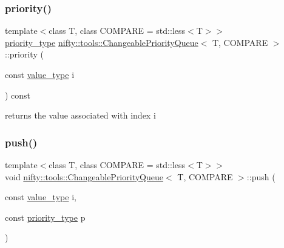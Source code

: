 \mbox{\label{classnifty_1_1tools_1_1ChangeablePriorityQueue_af437e744315c988b3cddbe66b4cfbe68}} 
\subsubsection{\texorpdfstring{priority()}{priority()}}
{\footnotesize\ttfamily template$<$class T, class C\+O\+M\+P\+A\+RE = std\+::less$<$\+T$>$$>$ \\
\hyperlink{classnifty_1_1tools_1_1ChangeablePriorityQueue_a6ecafb387f99a1cfa7ff5795c924682c}{priority\+\_\+type} \hyperlink{classnifty_1_1tools_1_1ChangeablePriorityQueue}{nifty\+::tools\+::\+Changeable\+Priority\+Queue}$<$ T, C\+O\+M\+P\+A\+RE $>$\+::priority (\begin{DoxyParamCaption}\item[{const \hyperlink{classnifty_1_1tools_1_1ChangeablePriorityQueue_aa00fbc748b94bdc6175b4c49bb2bba48}{value\+\_\+type}}]{i }\end{DoxyParamCaption}) const\hspace{0.3cm}{\ttfamily [inline]}}



returns the value associated with index i 

\mbox{\label{classnifty_1_1tools_1_1ChangeablePriorityQueue_ada41a7adfde46118d48833321ac94066}} 
\subsubsection{\texorpdfstring{push()}{push()}}
{\footnotesize\ttfamily template$<$class T, class C\+O\+M\+P\+A\+RE = std\+::less$<$\+T$>$$>$ \\
void \hyperlink{classnifty_1_1tools_1_1ChangeablePriorityQueue}{nifty\+::tools\+::\+Changeable\+Priority\+Queue}$<$ T, C\+O\+M\+P\+A\+RE $>$\+::push (\begin{DoxyParamCaption}\item[{const \hyperlink{classnifty_1_1tools_1_1ChangeablePriorityQueue_aa00fbc748b94bdc6175b4c49bb2bba48}{value\+\_\+type}}]{i,  }\item[{const \hyperlink{classnifty_1_1tools_1_1ChangeablePriorityQueue_a6ecafb387f99a1cfa7ff5795c924682c}{priority\+\_\+type}}]{p }\end{DoxyParamCaption})\hspace{0.3cm}{\ttfamily [inline]}}



